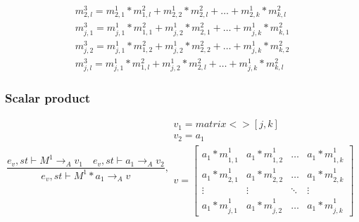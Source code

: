 \begin{minipage}{1.0\textwidth}
\begin{equation*}
\begin{aligned}
{ { m }_{ 2,l }^{ 3 } }  = { { m }_{ 2,1 }^{ 1 } } *{ { m }_{ 1,l }^{ 2 } }+ { { m }_{ 2,2 }^{ 1 } } *{ { m }_{ 2,l }^{ 2 } }+\dots+ { { m }_{ 2,k }^{ 1 } } *{ { m }_{ k,l }^{ 2 } }\\
{ { m }_{ j,1 }^{ 3 } }  = { { m }_{ j,1 }^{ 1 } } *{ { m }_{ 1,1 }^{ 2 } }+ { { m }_{ j,2 }^{ 1 } } *{ { m }_{ 2,1 }^{ 2 } }+\dots+ { { m }_{ j,k }^{ 1 } } *{ { m }_{ k,1 }^{ 2 } }\\
{ { m }_{ j,2 }^{ 3 } }  = { { m }_{ j,1 }^{ 1 } } *{ { m }_{ 1,2 }^{ 2 } }+ { { m }_{ j,2 }^{ 1 } } *{ { m }_{ 2,2 }^{ 2 } }+\dots+ { { m }_{ j,k }^{ 1 } } *{ { m }_{ k,2 }^{ 2 } }\\
{ { m }_{ j,l }^{ 3 } }  = { { m }_{ j,1 }^{ 1 } } *{ { m }_{ 1,l }^{ 2 } }+ { { m }_{ j,2 }^{ 1 } } *{ { m }_{ 2,l }^{ 2 } }+\dots+ { { m }_{ j,k }^{ 1 } } *{ { m }_{ k,l }^{ 2 } }
\end{aligned}
\end{equation*}
\end{minipage}

\subsubsection{Scalar product}
\begin{equation}
	\frac { { e }_{ v },st\vdash { M }^{ 1 }{ \rightarrow  }_{ A }{ v }_{ 1 }\quad { e }_{ v },st\vdash { a }_{ 1 }{ \rightarrow  }_{ A }{ v }_{ 2 } }{ { e }_{ v },st\vdash { M }^{ 1 }\ast { a }_{ 1 }{ \rightarrow  }_{ A }{ v } } ,\begin{matrix} { v }_{ 1 }=matrix<>[j,k] \\ { v }_{ 2 }={ a }_{ 1 } \\ v=\begin{bmatrix} { { a }_{ 1 }*m }_{ 1,1 }^{ 1 } & { { a }_{ 1 }*m }_{ 1,2 }^{ 1 } & \dots  & { { a }_{ 1 }*m }_{ 1,k }^{ 1 } \\
 { { a }_{ 1 }*m }_{ 2,1 }^{ 1 } & { { a }_{ 1 }*m }_{ 2,2 }^{ 1 } & \dots  & { { a }_{ 1 }*m }_{ 2,k }^{ 1 }  \\ \vdots & \vdots & \ddots & \vdots \\ { { a }_{ 1 }*m }_{ j,1 }^{ 1 } & { { a }_{ 1 }*m }_{ j,2 }^{ 1 } & \dots & { { a }_{ 1 }*m }_{ j,k }^{ 1 } \end{bmatrix} \end{matrix}
\end{equation}

